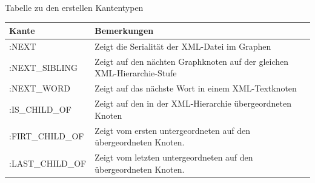 \documentclass[ngerman,]{scrreprt}
\begin{document}
Tabelle zu den erstellen Kantentypen

\begin{longtable}[]{@{}ll@{}}
\toprule
\begin{minipage}[b]{0.22\columnwidth}\raggedright\strut
Kante\strut
\end{minipage} & \begin{minipage}[b]{0.72\columnwidth}\raggedright\strut
Bemerkungen\strut
\end{minipage}\tabularnewline
\midrule
\endhead
\begin{minipage}[t]{0.22\columnwidth}\raggedright\strut
:NEXT\strut
\end{minipage} & \begin{minipage}[t]{0.72\columnwidth}\raggedright\strut
Zeigt die Serialität der XML-Datei im Graphen\strut
\end{minipage}\tabularnewline
\begin{minipage}[t]{0.22\columnwidth}\raggedright\strut
:NEXT\_SIBLING\strut
\end{minipage} & \begin{minipage}[t]{0.72\columnwidth}\raggedright\strut
Zeigt auf den nächten Graphknoten auf der gleichen XML-Hierarchie-Stufe\strut
\end{minipage}\tabularnewline
\begin{minipage}[t]{0.22\columnwidth}\raggedright\strut
:NEXT\_WORD\strut
\end{minipage} & \begin{minipage}[t]{0.72\columnwidth}\raggedright\strut
Zeigt auf das nächste Wort in einem XML-Textknoten\strut
\end{minipage}\tabularnewline
\begin{minipage}[t]{0.22\columnwidth}\raggedright\strut
:IS\_CHILD\_OF\strut
\end{minipage} & \begin{minipage}[t]{0.72\columnwidth}\raggedright\strut
Zeigt auf den in der XML-Hierarchie übergeordneten Knoten\strut
\end{minipage}\tabularnewline
\begin{minipage}[t]{0.22\columnwidth}\raggedright\strut
:FIRT\_CHILD\_OF\strut
\end{minipage} & \begin{minipage}[t]{0.72\columnwidth}\raggedright\strut
Zeigt vom ersten untergeordneten auf den übergeordneten Knoten.\strut
\end{minipage}\tabularnewline
\begin{minipage}[t]{0.22\columnwidth}\raggedright\strut
:LAST\_CHILD\_OF\strut
\end{minipage} & \begin{minipage}[t]{0.72\columnwidth}\raggedright\strut
Zeigt vom letzten untergeordneten auf den übergeordneten Knoten.\strut
\end{minipage}\tabularnewline
\bottomrule
\end{longtable}
\end{document}
